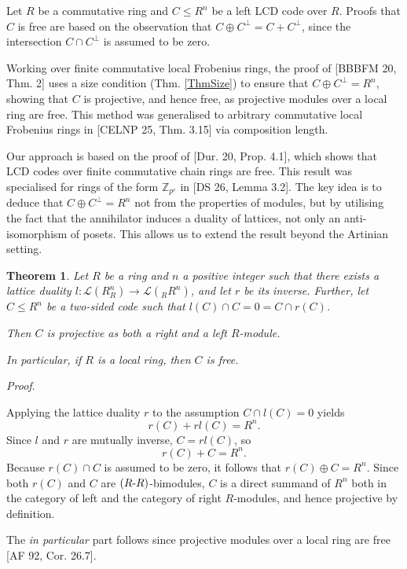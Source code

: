 \documentclass{article}
\theoremstyle{plain}
\newtheorem{Thm}[veta]{Theorem}
\theoremstyle{plain}
\theoremstyle{remark}
\theoremstyle{plain}
\newcommand{\Z}{\mathbb{Z}}
\newenvironment{dukaz}{
  \par\medskip \noindent
  \textit{Proof}.
}{

\rightline{$\qedsymbol$}
}
\begin{document}
Let $R$ be a commutative ring and $C\leq R^n$ be a left LCD code over $R$.
Proofs that $C$ is free are based on the observation that $C\oplus C^\perp=C+ C^\perp$, since the intersection $C\cap C^\perp$ is assumed to be zero.

Working over finite commutative local Frobenius rings, the proof of [BBBFM 20, Thm. 2]
uses a size condition (Thm. \ref{ThmSize}) to ensure that $C\oplus C^\perp=R^n$, showing that $C$ is projective, and hence free, as projective modules over a local ring are free.
This method was generalised to arbitrary commutative local Frobenius rings in [CELNP 25, Thm. 3.15] via composition length.

Our approach is based on the proof of [Dur. 20, Prop. 4.1], which shows that LCD codes over finite commutative chain rings are free. This result was specialised for rings of the form $\Z_{p^e}$ in [DS 26, Lemma 3.2]. The key idea is to deduce that $C\oplus C^\perp=R^n$ not from the properties of modules, but by utilising the fact that the annihilator induces a duality of lattices, not only an anti-isomorphism of posets. This allows us to extend the result beyond the Artinian setting.


\begin{Thm}\label{ThmCommMain}
    Let $R$ be a ring and $n$ a positive integer such that there exists a lattice duality $l\colon \mathcal{L}(R^n_R)\to  \mathcal{L}({}_RR^n)$, and let $r$ be its inverse.   Further, let $C\leq R^n$ be a two-sided code such that $l(C)\cap C=0=C\cap r(C)$.
    
     Then $C$ is projective as both a right and a left $R$-module.

     In particular, if $R$ is a local ring, then $C$ is free.
\end{Thm}
\begin{dukaz}
    Applying the lattice duality $r$ to the assumption $C\cap l(C)=0$
    yields \[r(C)+rl(C)=R^n.\]
Since $l$ and $r$ are mutually inverse, $C=rl(C)$, so
\[r(C)+C=R^n.\]
Because $r(C)\cap C$ is assumed to be zero, it follows that $r(C)\oplus C=R^n$. Since both $r(C)$ and $C$ are $(R\text-R)$-bimodules, $C$ is a direct summand of $R^n$ both in the category of left and the category of right $ R$-modules, and hence projective by definition.

The \textit{in particular} part follows since projective modules over a local ring are free [AF 92, Cor. 26.7].
\end{dukaz}
\end{document}
